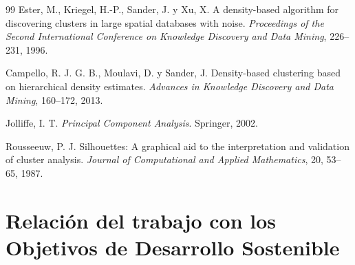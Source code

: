 \documentclass[11pt,spanish,listoffigures,listoftables]{tfgetsinf}
\begin{document}
\begin{thebibliography}{99}
Ester, M., Kriegel, H.-P., Sander, J. y Xu, X.
\newblock A density-based algorithm for discovering clusters in large spatial databases with noise.
\newblock \textit{Proceedings of the Second International Conference on Knowledge Discovery and Data Mining}, 226--231, 1996.

Campello, R. J. G. B., Moulavi, D. y Sander, J.
\newblock Density-based clustering based on hierarchical density estimates.
\newblock \textit{Advances in Knowledge Discovery and Data Mining}, 160--172, 2013.

Jolliffe, I. T.
\newblock \textit{Principal Component Analysis}.
\newblock Springer, 2002.

Rousseeuw, P. J.
\newblock Silhouettes: A graphical aid to the interpretation and validation of cluster analysis.
\newblock \textit{Journal of Computational and Applied Mathematics}, 20, 53--65, 1987.

%
%
%
%
%
%
%
%
%
%
%


\end{thebibliography}
\cleardoublepage



\APPENDIX


\chapter{Relación del trabajo con los Objetivos de Desarrollo Sostenible}
\end{document}
